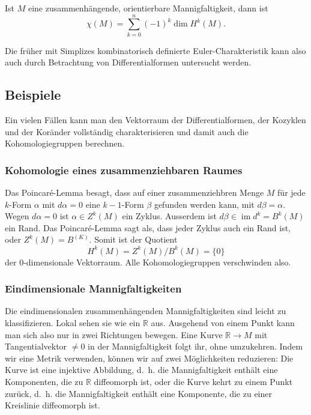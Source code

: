 \begin{satz}
%
Ist $M$ eine zusammenhängende, orientierbare Mannigfaltigkeit, dann ist
\[
\chi(M)
=
\sum_{k=0}^n (-1)^k \dim H^k(M).
\]
\end{satz}

Die früher mit Simplizes kombinatorisch definierte Euler-Charakteristik
kann also auch durch Betrachtung von Differentialformen untersucht
werden.

%
%
\subsection{Beispiele}
Ein vielen Fällen kann man den Vektorraum der Differentialformen,
der Kozyklen und der Koränder vollständig charakterisieren und damit
auch die Kohomologiegruppen berechnen.

%
%
\subsubsection{Kohomologie eines zusammenziehbaren Raumes}
Das Poincaré-Lemma besagt, dass auf einer zusammenziehbren Menge
$M$ für jede $k$-Form $\alpha$ mit $d\alpha=0$ eine $k-1$-Form
$\beta$ gefunden werden kann, mit $d\beta = \alpha$.
Wegen $d\alpha=0$ ist $\alpha\in Z^k(M)$ ein Zyklus.
Ausserdem ist $d\beta\in \operatorname{im}d^k = B^k(M)$ ein Rand.
Das Poincaré-Lemma sagt als, dass jeder Zyklus auch ein Rand ist,
oder $Z^k(M) = B^(K)$.
Somit ist der Quotient
\[
H^k(M)
=
Z^k(M) / B^k(M)
=
\{0\}
\]
der 0-dimensionale Vektorraum.
Alle Kohomologiegruppen verschwinden also.

%
%
\subsubsection{Eindimensionale Mannigfaltigkeiten}
Die eindimensionalen zusammenhängenden Mannigfaltigkeiten sind leicht
zu klassifizieren.
Lokal sehen sie wie ein $\mathbb{R}$ aus.
Ausgehend von einem Punkt kann man sich also nur in zwei Richtungen
bewegen.
Eine Kurve $\mathbb{R}\to M$ mit Tangentialvektor $\ne 0$ in der
Mannigfaltigkeit folgt ihr, ohne umzukehren.
Indem wir eine Metrik verwenden, können wir auf zwei Möglichkeiten
reduzieren: Die Kurve ist eine injektive Abbildung, d.~h. die Mannigfaltigkeit
enthält eine Komponenten, die zu $\mathbb{R}$ diffeomorph ist,
oder die Kurve kehrt zu einem Punkt zurück, d.~h. die Mannigfaltigkeit
enthält eine Komponente, die zu einer Kreislinie diffeomorph ist.

